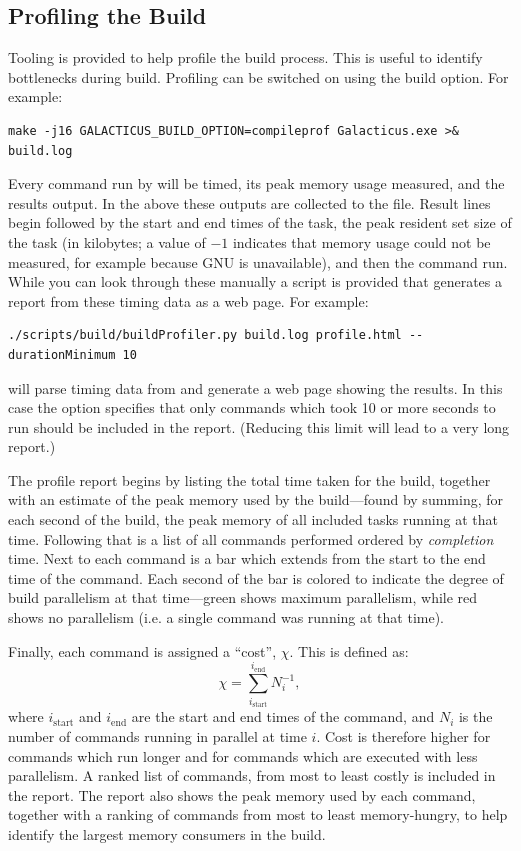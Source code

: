 \subsection{Profiling the Build}

Tooling is provided to help profile the build process. This is useful to identify bottlenecks during build. Profiling can be switched on using the  build option. For example:
\begin{verbatim}
make -j16 GALACTICUS_BUILD_OPTION=compileprof Galacticus.exe >& build.log
\end{verbatim}
Every command run by  will be timed, its peak memory usage measured, and the results output. In the above these outputs are collected to the  file. Result lines begin  followed by the start and end times of the task, the peak resident set size of the task (in kilobytes; a value of $-1$ indicates that memory usage could not be measured, for example because GNU  is unavailable), and then the command run. While you can look through these manually a script is provided that generates a report from these timing data as a web page. For example:
\begin{verbatim}
./scripts/build/buildProfiler.py build.log profile.html --durationMinimum 10
\end{verbatim}
will parse timing data from  and generate a web page  showing the results. In this case the  option specifies that only commands which took 10 or more seconds to run should be included in the report. (Reducing this limit will lead to a very long report.)

The profile report begins by listing the total time taken for the build, together with an estimate of the peak memory used by the build---found by summing, for each second of the build, the peak memory of all included tasks running at that time. Following that is a list of all commands performed ordered by \emph{completion} time. Next to each command is a bar which extends from the start to the end time of the command. Each second of the bar is colored to indicate the degree of build parallelism at that time---green shows maximum parallelism, while red shows no parallelism (i.e. a single command was running at that time).

Finally, each command is assigned a ``cost'', $\chi$. This is defined as:
\begin{equation}
  \chi = \sum_{i_\mathrm{start}}^{i_\mathrm{end}} N_i^{-1},
\end{equation}
where $i_\mathrm{start}$ and $i_\mathrm{end}$ are the start and end times of the command, and $N_i$ is the number of commands running in parallel at time $i$. Cost is therefore higher for commands which run longer and for commands which are executed with less parallelism. A ranked list of commands, from most to least costly is included in the report. The report also shows the peak memory used by each command, together with a ranking of commands from most to least memory-hungry, to help identify the largest memory consumers in the build.
